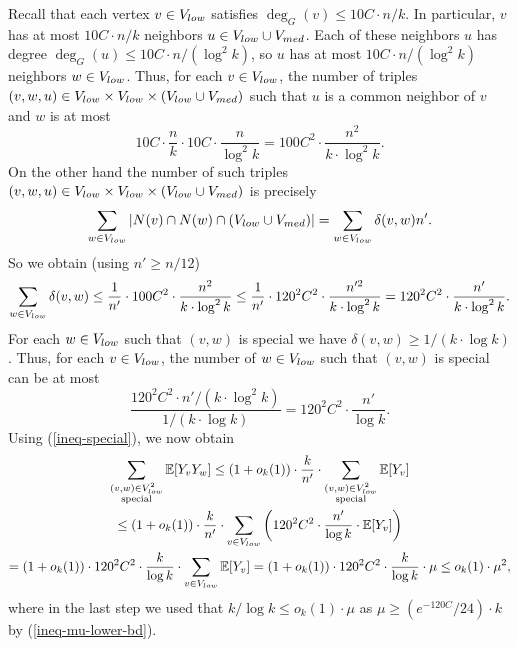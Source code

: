 \documentclass[11pt]{article}
\theoremstyle{definition}
\numberwithin{equation}{section}
\begin{document}
Recall that each vertex $v\in V_{\textnormal{low}}$ satisfies $\deg_G(v)\leq 10C\cdot n/k$. In particular, $v$ has at most $10C\cdot n/k$ neighbors $u\in V_{\textnormal{low}}\cup V_{\textnormal{med}}$. Each of these neighbors $u$ has degree $\deg_G(u)\leq 10C\cdot n/(\log^2 k)$, so $u$ has at most $10C\cdot n/(\log^2 k)$ neighbors $w\in V_{\textnormal{low}}$. Thus, for each $v\in V_{\textnormal{low}}$, the number of triples $(v,w,u)\in V_{\textnormal{low}}\times V_{\textnormal{low}}\times (V_{\textnormal{low}}\cup V_{\textnormal{med}})$ such that $u$ is a common neighbor of $v$ and $w$ is at most
\[10C\cdot \frac{n}{k}\cdot 10C\cdot \frac{n}{\log^2 k}=100C^2\cdot \frac{n^2}{k\cdot \log^2 k}.\]
On the other hand the number of such triples $(v,w,u)\in V_{\textnormal{low}}\times V_{\textnormal{low}}\times (V_{\textnormal{low}}\cup V_{\textnormal{med}})$ is precisely
\[\sum_{w\in V_{\textnormal{low}}}\vert N(v)\cap N(w)\cap (V_{\textnormal{low}}\cup V_{\textnormal{med}})\vert=\sum_{w\in V_{\textnormal{low}}}\delta(v,w)n'.\]
So we obtain (using $n'\geq n/12$)
\[\sum_{w\in V_{\textnormal{low}}}\delta(v,w)\leq \frac{1}{n'}\cdot 100C^2\cdot \frac{n^2}{k\cdot \log^2 k}\leq \frac{1}{n'}\cdot 120^2C^2\cdot \frac{n'^2}{k\cdot \log^2 k} =120^2C^2\cdot \frac{n'}{k\cdot \log^2 k}.\]
For each $w\in V_{\textnormal{low}}$ such that $(v,w)$ is special we have $\delta(v,w)\geq 1/(k\cdot \log k)$. Thus, for each $v\in V_{\textnormal{low}}$, the number of $w\in V_{\textnormal{low}}$ such that $(v,w)$ is special can be at most
\[\frac{120^2C^2\cdot n'/(k\cdot \log^2 k)}{1/(k\cdot \log k)}=120^2C^2\cdot\frac{n'}{\log k}.\]
Using (\ref{ineq-special}), we now obtain
\begin{multline}\label{ineq-special-2}
\sum_{\substack{(v,w)\in V_{\textnormal{low}}^2\\\text{special}}}\mathbb{E}[Y_vY_w]\leq (1+o_k(1))\cdot \frac{k}{n'}\cdot \sum_{\substack{(v,w)\in V_{\textnormal{low}}^2\\\text{special}}}\mathbb{E}[Y_v]\\
\leq (1+o_k(1))\cdot \frac{k}{n'}\cdot \sum_{v\in V_{\textnormal{low}}}\left(120^2C^2\cdot\frac{n'}{\log k}\cdot\mathbb{E}[Y_v]\right)\\
= (1+o_k(1))\cdot 120^2C^2\cdot \frac{k}{\log k}\cdot \sum_{v\in V_{\textnormal{low}}}\mathbb{E}[Y_v] =(1+o_k(1))\cdot 120^2C^2\cdot \frac{k}{\log k}\cdot\mu\leq o_k(1)\cdot \mu^2,
\end{multline}
where in the last step we used that $k/\log k\leq o_k(1)\cdot \mu$ as $\mu\geq (e^{-120C}/24)\cdot k$ by (\ref{ineq-mu-lower-bd}).
\end{document}

